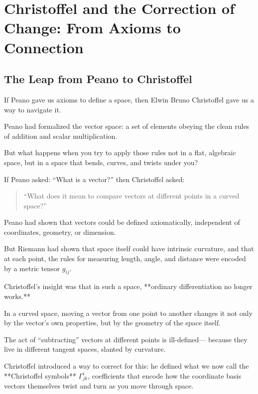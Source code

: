 \section{Christoffel and the Correction of Change: From Axioms to Connection}



\subsection{The Leap from Peano to Christoffel}

If Peano gave us axioms to define a space,  
then Elwin Bruno Christoffel gave us a way to navigate it.

Peano had formalized the vector space:  
a set of elements obeying the clean rules of addition and scalar multiplication.

But what happens when you try to apply those rules not in a flat, algebraic space,  
but in a space that bends, curves, and twists under you?

If Peano asked: “What is a vector?”  
then Christoffel asked:

\begin{quote}
“What does it mean to compare vectors at different points in a curved space?”
\end{quote}

Peano had shown that vectors could be defined axiomatically,  
independent of coordinates, geometry, or dimension.

But Riemann had shown that space itself could have intrinsic curvature,  
and that at each point, the rules for measuring length, angle, and distance were encoded by a metric tensor \( g_{ij} \).

Christoffel’s insight was that in such a space, **ordinary differentiation no longer works.**

In a curved space, moving a vector from one point to another changes it not only by the vector’s own properties,  
but by the geometry of the space itself.

The act of “subtracting” vectors at different points is ill-defined—  
because they live in different tangent spaces, slanted by curvature.

\bigskip

Christoffel introduced a way to correct for this:  
he defined what we now call the **Christoffel symbols** \( \Gamma^i_{jk} \),  
coefficients that encode how the coordinate basis vectors themselves twist and turn as you move through space.

